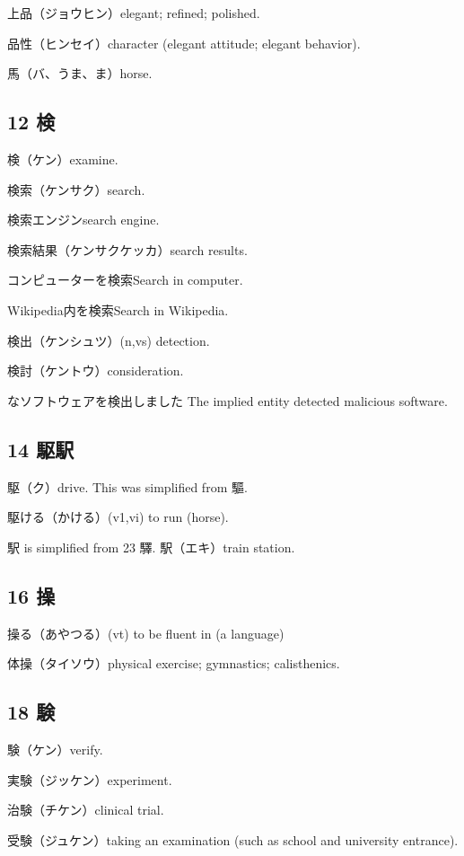 上品（ジョウヒン）elegant; refined; polished.

品性（ヒンセイ）character (elegant attitude; elegant behavior).

馬（バ、うま、ま）horse.

\subsection{12 検}

検（ケン）examine.

検索（ケンサク）search.

検索エンジンsearch engine.

検索結果（ケンサクケッカ）search results.

コンピューターを検索Search in computer.

Wikipedia内を検索Search in Wikipedia.

検出（ケンシュツ）(n,vs) detection.

検討（ケントウ）consideration.

なソフトウェアを検出しました
The implied entity detected malicious software.

\subsection{14 駆駅}

駆（ク）drive.
This was simplified from 驅.

駆ける（かける）(v1,vi) to run (horse).

駅 is simplified from 23 驛.
駅（エキ）train station.

\subsection{16 操}

操る（あやつる）(vt) to be fluent in (a language)

体操（タイソウ）physical exercise; gymnastics; calisthenics.

\subsection{18 験}

験（ケン）verify.

実験（ジッケン）experiment.

治験（チケン）clinical trial.

受験（ジュケン）taking an examination (such as school and university entrance).

